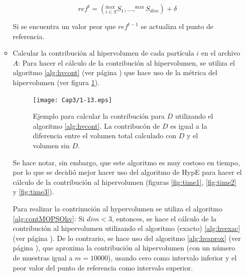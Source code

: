 \begin{enumerate}
\begin{itemize}
      \[ref^t = \left(^{\max}_{i\in S}S_1, \ldots, ^{\max}S_{dim} \right) + \delta\]

      Si se encuentra un valor peor que $ref^{t-1}$ se actualiza el punto de referencia. 
      
      \item Calcular la contribuci\'on al hipervolumen de cada part\'icula $i$ en el archivo $A$:       
      Para hacer el c\'alculo de la contribuci\'on al hipervolumen, se utiliza el algoritmo \ref{alg:hvcont} 
      (ver p\'agina \pageref{alg:hvcont}) que hace uso de la m\'etrica del hipervolumen (ver figura \ref{fig:contribucion}).
      
      \begin{figure}
      \begin{center}
	  \texttt{[image: Cap3/1-13.eps]}
      \end{center}
	\caption[Ejemplo de calculo de la contribuci\'on al hipervolumen]{Ejemplo para calcular la contribuci\'on para $D$ utilizando 
	el algoritmo \ref{alg:hvcont}. La contribuc\'on de $D$ es igual a la diferencia entre el volumen total calculado con $D$ y el 
	volumen sin $D$.}
      \label{fig:contribucion}
      \end{figure}
       
      Se hace notar, sin embargo, que este algoritmo es muy costoso en tiempo, por lo que se 
      decidi\'o mejor hacer uso del algoritmo de HypE para hacer el c\'alculo de la contribuci\'on al hipervolumen
      (figuras \ref{fig:time1}, \ref{fig:time2} y \ref{fig:time3}).
            
      Para realizar la contrinuci\'on al hypervolumen se utiliza el algoritmo \ref{alg:contMOPSOhv}:
      Si $dim < 3$, entonces, se hace el c\'alculo de la contribuci\'on al hipervolumen utilizando el algoritmo (exacto) \ref{alg:hvexac} 
      (ver p\'agina \pageref{alg:hvexac}). De lo contrario, se hace uso del algoritmo \ref{alg:hvaprox} 
      (ver p\'agina \pageref{alg:hvaprox}), que aproxima la contribuci\'on al hipervolumen (con un n\'umero de muestras 
      igual a $m=10000$), usando cero como intervalo inferior y el peor valor del punto de referencia como intervalo superior.  
           

\end{itemize}
\end{enumerate}

